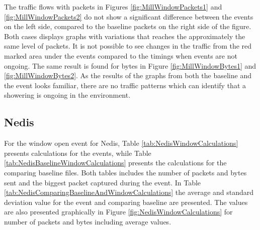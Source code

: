 The traffic flows with packets in Figures \ref{fig:MillWindowPackets1} and \ref{fig:MillWindowPackets2} do not show a significant difference between the events on the left side, compared to the baseline packets on the right side of the figure. Both cases displays graphs with variations that reaches the approximately the same level of packets. It is not possible to see changes in the traffic from the red marked area under the events compared to the timings when events are not ongoing. The same result is found for bytes in Figure \ref{fig:MillWindowBytes1} and \ref{fig:MillWindowBytes2}. As the results of the graphs from both the baseline and the event looks familiar, there are no traffic patterns which can identify that a showering is ongoing in the environment. 

\newpage
\subsection{Nedis}
For the window open event for Nedis, Table \ref{tab:NedisWindowCalculations} presents calculations for the events, while Table \ref{tab:NedisBaselineWindowCalculations} presents the calculations for the comparing baseline files. Both tables includes the number of packets and bytes sent and the biggest packet captured during the event. In Table \ref{tab:NedisComparingBaselineAndWindowCalculations} the average and standard deviation value for the event and comparing baseline are presented. The values are also presented graphically in Figure \ref{fig:NedisWindowCalculations} for number of packets and bytes including average values. 

